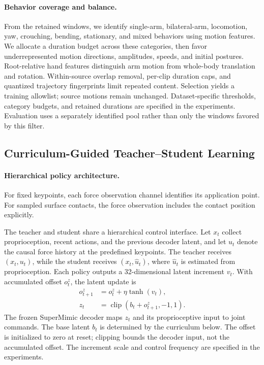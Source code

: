 \paragraph{Behavior coverage and balance.}
From the retained windows, we identify single-arm, bilateral-arm, locomotion, yaw, crouching, bending, stationary, and mixed behaviors using motion features. We allocate a duration budget across these categories, then favor underrepresented motion directions, amplitudes, speeds, and initial postures. Root-relative hand features distinguish arm motion from whole-body translation and rotation. Within-source overlap removal, per-clip duration caps, and quantized trajectory fingerprints limit repeated content. Selection yields a training allowlist; source motions remain unchanged. Dataset-specific thresholds, category budgets, and retained durations are specified in the experiments. Evaluation uses a separately identified pool rather than only the windows favored by this filter.

\subsection{Curriculum-Guided Teacher--Student Learning}
\label{sec:teacher_student}

\paragraph{Hierarchical policy architecture.}
\label{sec:latent_control}
For fixed keypoints, each force observation channel identifies its application point. For sampled surface contacts, the force observation includes the contact position explicitly.

The teacher and student share a hierarchical control interface. Let $x_t$ collect proprioception, recent actions, and the previous decoder latent, and let $u_t$ denote the causal force history at the predefined keypoints. The teacher receives $(x_t,u_t)$, while the student receives $(x_t,\hat u_t)$, where $\hat u_t$ is estimated from proprioception. Each policy outputs a 32-dimensional latent increment $v_t$. With accumulated offset $o_t^z$, the latent update is
\begin{equation}
    \begin{aligned}
    o_{t+1}^z &= o_t^z+\eta\tanh(v_t), \\
    z_t &= \operatorname{clip}(b_t+o_{t+1}^z,-1,1).
    \end{aligned}
    \label{eq:latent_increment}
\end{equation}
The frozen SuperMimic decoder maps $z_t$ and its proprioceptive input to joint commands. The base latent $b_t$ is determined by the curriculum below. The offset is initialized to zero at reset; clipping bounds the decoder input, not the accumulated offset. The increment scale and control frequency are specified in the experiments.


